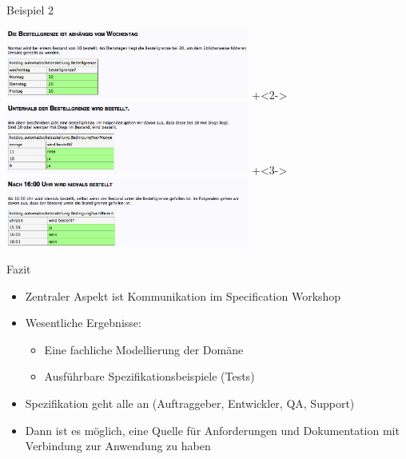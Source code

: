 \begin{frame}{Beispiel 2}

\begin{center}
\includegraphics[width=8cm]{GutesBeispiel1.png} \newline
\onslide+<2->
\includegraphics[width=8cm]{GutesBeispiel2.png} \newline
\onslide+<3->
\includegraphics[width=8cm]{GutesBeispiel3.png} \newline
\end{center}

\end{frame}

\begin{frame}{Fazit}

\begin{itemize}
	\item Zentraler Aspekt ist Kommunikation im Specification Workshop
	\item Wesentliche Ergebnisse:
	\begin{itemize}
		\item Eine fachliche Modellierung der Domäne
		\item Ausführbare Spezifikationsbeispiele (Tests)
	\end{itemize}
	\item Spezifikation geht alle an (Auftraggeber, Entwickler, QA, Support)
	\item Dann ist es möglich, eine Quelle für Anforderungen und Dokumentation mit Verbindung zur Anwendung zu haben
\end{itemize}

\end{frame}

